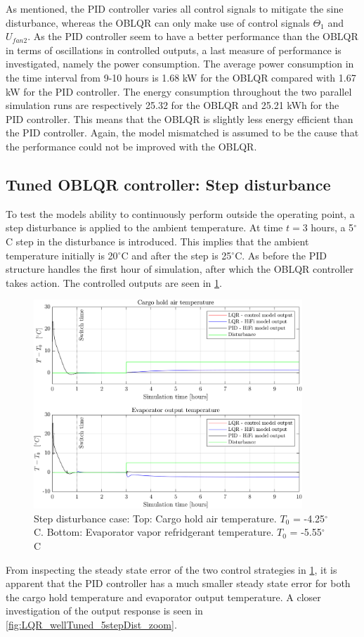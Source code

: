 As mentioned, the PID controller varies all control signals to mitigate the sine disturbance, whereas the OBLQR can only make use of control signals $ \Theta_1 $ and $ U_{fan2} $. As the PID controller seem to have a better performance than the OBLQR in terms of oscillations in controlled outputs, a last measure of performance is investigated, namely the power consumption.  
The average power consumption in the time interval from 9-10 hours is 1.68 \si{kW} for the OBLQR compared with 1.67 \si{kW} for the PID controller. The energy consumption throughout the two parallel simulation runs are respectively 25.32 for the OBLQR and 25.21 \si{kWh} for the PID controller. This means that the OBLQR is slightly less energy efficient than the PID controller. Again, the model mismatched is assumed to be the cause that the performance could not be improved with the OBLQR.

\subsection{Tuned OBLQR controller: Step disturbance}
To test the models ability to continuously perform outside the operating point, a step disturbance is applied to the ambient temperature.  At time $t=3$ hours, a 5$^{\circ}$C step in the disturbance is introduced. This implies that the ambient temperature initially is 20$^{\circ}$C and after the step is 25$^{\circ}$C. As before the PID structure handles the first hour of simulation, after which the OBLQR controller takes action. The controlled outputs are seen in \cref{fig:LQR_wellTuned_5stepDist}.
\begin{figure}[H]
	\centering
	\includegraphics[width=0.9\textwidth]{Graphics/fig_LQRvsKresten_stepDist.png}
	\caption{Step disturbance case: Top: Cargo hold air temperature. $T_0$ = -4.25$^{\circ}$C. Bottom: Evaporator vapor refridgerant temperature. $T_0$ = -5.55$^{\circ}$C}
	\label{fig:LQR_wellTuned_5stepDist}
\end{figure}
From inspecting the steady state error of the two control strategies in \cref{fig:LQR_wellTuned_5stepDist}, it is apparent that the PID controller has a much smaller steady state error for both the cargo hold temperature and evaporator output temperature. A closer investigation of the output response is seen in
\cref{fig:LQR_wellTuned_5stepDist_zoom}. 

